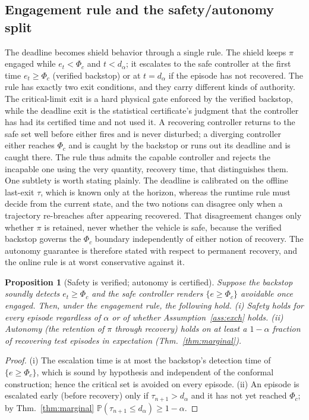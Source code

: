 \documentclass[journal]{IEEEtran}
\theoremstyle{plain}
\newtheorem{proposition}{Proposition}
\theoremstyle{definition}
\newcommand{\Prob}{\mathbb{P}}
\newcommand{\dalpha}{d_{\alpha}}
\begin{document}
\subsection{Engagement rule and the safety/autonomy split} The deadline becomes shield
behavior through a single rule. The shield keeps $\pi$ engaged
while $e_t<\Phi_c$ and $t<\dalpha$; it escalates to the safe controller at the first time
$e_t\ge\Phi_c$ (verified backstop) or at $t=\dalpha$ if the episode has not recovered. The
rule has exactly two exit conditions, and they carry different kinds of authority. The
critical-limit exit is a hard physical gate enforced by the verified backstop, while the
deadline exit is the statistical certificate's judgment that the controller has had its
certified time and not used it. A recovering controller returns to the safe set well before
either fires and is never disturbed; a diverging controller either reaches $\Phi_c$ and is
caught by the backstop or runs out its deadline and is caught there. The rule thus admits the
capable controller and rejects the incapable one using the very quantity, recovery time, that
distinguishes them. One subtlety is
worth stating plainly. The deadline is calibrated on the offline last-exit $\tau$, which is
known only at the horizon, whereas the runtime rule must decide from the current state, and
the two notions can disagree only when a trajectory re-breaches after appearing recovered.
That disagreement changes only whether $\pi$ is retained, never whether the vehicle is safe,
because the verified backstop governs the $\Phi_c$ boundary independently of either notion of
recovery. The autonomy guarantee is therefore stated with respect to permanent recovery,
and the online rule is at worst conservative against it.

\begin{proposition}[Safety is verified; autonomy is certified]
\label{prop:safety}
Suppose the backstop soundly detects $e_t\ge\Phi_c$ and the safe controller renders
$\{e\ge\Phi_c\}$ avoidable once engaged. Then, under the engagement rule, the following hold.
(i) \emph{Safety} holds for \emph{every} episode regardless of $\alpha$ or of whether
Assumption~\ref{ass:exch} holds. (ii) \emph{Autonomy} (the retention of $\pi$ through
recovery) holds on at least a $1-\alpha$ fraction of recovering test episodes in
expectation (Thm.~\ref{thm:marginal}).
\end{proposition}
\begin{proof}
(i) The escalation time is at most the backstop's detection time of $\{e\ge\Phi_c\}$, which
is sound by hypothesis and independent of the conformal construction; hence the critical set
is avoided on every episode. (ii) An episode is escalated early (before recovery) only if
$\tau_{n+1}>\dalpha$ and it has not yet reached $\Phi_c$; by Thm.~\ref{thm:marginal}
$\Prob(\tau_{n+1}\le\dalpha)\ge1-\alpha$.
\end{proof}
\end{document}
